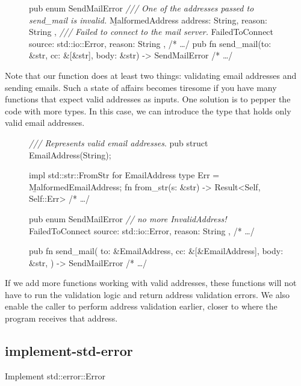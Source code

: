 \documentclass{article}
\begin{document}
\begin{figure}
\begin{code}[bad]
pub enum SendMailError {
  \emph{/// One of the addresses passed to send\_mail is invalid.}
  \b{MalformedAddress} { address: String, reason: String },
  \emph{/// Failed to connect to the mail server.}
  FailedToConnect { source: std::io::Error, reason: String },
  /* \ldots  */
}
pub fn send\_mail(to: &str, cc: &[&str], body: &str) -> SendMailError { /* \ldots  */ }
\end{code}
\end{figure}

Note that our  function does at least two things: validating email addresses and sending emails.
Such a state of affairs becomes tiresome if you have many functions that expect valid addresses as inputs.
One solution is to pepper the code with more types.
In this case, we can introduce the  type that holds only valid email addresses.

\begin{figure}
\begin{code}[good]
\emph{/// Represents valid email addresses}.
pub struct EmailAddress(String);

impl std::str::FromStr for EmailAddress {
  type Err = \b{MalformedEmailAddress};
  fn from_str(s: &str) -> Result<Self, Self::Err> { /* \ldots  */ }
}

pub enum SendMailError {
  \emph{// no more InvalidAddress!}
  FailedToConnect { source: std::io::Error, reason: String },
  /* \ldots  */
}

pub fn send_mail(
    to: &EmailAddress,
    cc: &[&EmailAddress],
    body: &str,
) -> SendMailError { /* \ldots  */ }
\end{code}
\end{figure}

If we add more functions working with valid addresses, these functions will not have to run the validation logic and return address validation errors.
We also enable the caller to perform address validation earlier, closer to where the program receives that address.

\subsection{implement-std-error}{Implement std::error::Error}
\end{document}
